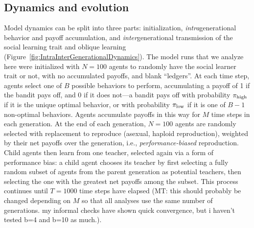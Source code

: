 \documentclass[letterpaper,11.5pt]{scrartcl}
\newcommand{\mt}[1]{{\textcolor{myorange} {({\tiny MT:} #1)}}}
\begin{document}
\subsection{Dynamics and evolution}

Model dynamics can be split into three parts: initialization,
\emph{intra}generational behavior and payoff accumulation, and
\emph{inter}generational transmission of the social learning trait and oblique
learning (Figure~\ref{fig:IntraInterGenerationalDynamics}). 
The model runs that we analyze here were initialized with $N=100$ agents
to randomly have the social learner trait or not, with no accumulated payoffs, and
blank ``ledgers''. At each time step, agents select one of $B$ possible behaviors
to perform, accumulating a payoff of 1 if the bandit pays off, and 0 if it does
not---a bandit pays off with probability $\pi_{\mathrm{high}}$ if it is the unique optimal
behavior, or with probability $\pi_{\mathrm{low}}$ if it is one of $B-1$ non-optimal
behaviors. Agents accumulate payoffs in this way for $M$ time steps in each
generation. At the end of each generation, $N=100$ agents are randomly selected with
replacement to reproduce (asexual, haploid reproduction), 
weighted by their net payoffs over the generation,
i.e., \emph{performance-biased} reproduction. Child agents then learn from 
one teacher, selected again via a form of performance bias: a child agent chooses
its teacher by first selecting a fully random subset of agents from the 
parent generation as potential teachers, then selecting the one with the 
greatest net payoffs among the subset. This process continues until $T=1000$
time steps have elapsed \mt{this should probably be changed depending on $M$ so that
    all analyses use the same number of generations. my informal checks have shown quick
convergence, but i haven't tested b=4 and b=10 as much.}.
\end{document}
